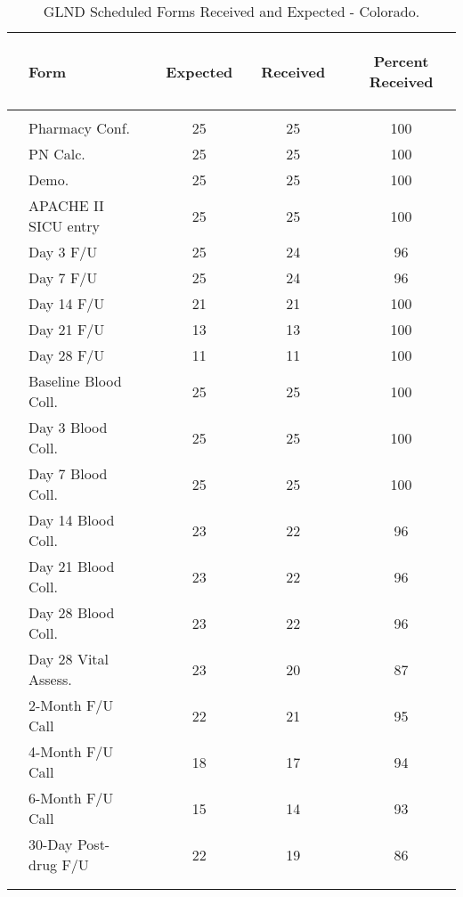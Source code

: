 \documentclass[dvips,10pt]{article}
\begin{document}
\clearpage
\begin{table}[t]
\caption
{ GLND Scheduled Forms Received and Expected - Colorado. }
\begin{center}
\begin{tabular}{ @{}l@{}
@{}l@{}@{}p{1.5em}@{}@{}c@{}@{}p{1.5em}@{}@{}c@{}@{}p{1.5em}@{}@{}c@{}
}
\hline

& \parbox{6em}{\begin{center}Form\end{center}} && \parbox{6em}{\begin{center}Expected\end{center}} && \parbox{6em}{\begin{center}Received\end{center}} && \parbox{6em}{\begin{center}Percent Received\end{center}} \\

\hline

\\
& Pharmacy Conf. && 25 && 25 && 100 \\
& PN Calc. && 25 && 25 && 100 \\
& Demo. && 25 && 25 && 100 \\
& APACHE II SICU entry && 25 && 25 && 100 \\
& Day 3 F/U && 25 && 24 && 96 \\
& Day 7 F/U && 25 && 24 && 96 \\
& Day 14 F/U && 21 && 21 && 100 \\
& Day 21 F/U && 13 && 13 && 100 \\
& Day 28 F/U && 11 && 11 && 100 \\
& Baseline Blood Coll. && 25 && 25 && 100 \\
& Day 3 Blood Coll. && 25 && 25 && 100 \\
& Day 7 Blood Coll. && 25 && 25 && 100 \\
& Day 14 Blood Coll. && 23 && 22 && 96 \\
& Day 21 Blood Coll. && 23 && 22 && 96 \\
& Day 28 Blood Coll. && 23 && 22 && 96 \\
& Day 28 Vital Assess. && 23 && 20 && 87 \\
& 2-Month F/U Call && 22 && 21 && 95 \\
& 4-Month F/U Call && 18 && 17 && 94 \\
& 6-Month F/U Call && 15 && 14 && 93 \\
& 30-Day Post-drug F/U && 22 && 19 && 86 \\
\\
\hline \\

\end{tabular}

\end{center}
 \end{table}
\end{document}
